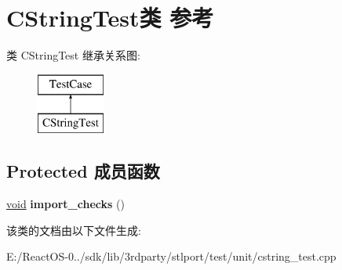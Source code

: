 \hypertarget{class_c_string_test}{}\section{C\+String\+Test类 参考}
\label{class_c_string_test}
类 C\+String\+Test 继承关系图\+:\begin{figure}[H]
\begin{center}
\leavevmode
\includegraphics[height=2.000000cm]{class_c_string_test}
\end{center}
\end{figure}
\subsection*{Protected 成员函数}
\begin{DoxyCompactItemize}
\item 
\mbox{\label{class_c_string_test_a0ebdca0d887a4c62bafe4ded020e8032}} 
\hyperlink{interfacevoid}{void} {\bfseries import\+\_\+checks} ()
\end{DoxyCompactItemize}


该类的文档由以下文件生成\+:\begin{DoxyCompactItemize}
\item 
E\+:/\+React\+O\+S-\/0../sdk/lib/3rdparty/stlport/test/unit/cstring\+\_\+test.\+cpp\end{DoxyCompactItemize}
